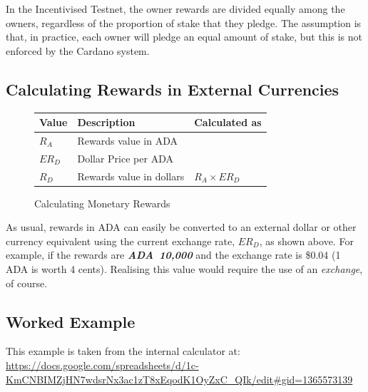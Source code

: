 \documentclass[11pt,a4paper,dvipsnames,twosided,final]{article}
\newcommand{\ada}{ADA{}}
\newcommand{\ADA}[1]{\textbf{\emph{\ada~{#1}}}}
\newcommand{\cardano}[1]{Cardano}
\begin{document}
\noindent
In the Incentivised Testnet, the owner rewards are divided equally among the
owners, regardless of the proportion of stake that they pledge.  The assumption
is that, in practice, each owner will pledge an equal amount of stake, but this
is not enforced by the \cardano{} system.

\clearpage
\subsection{Calculating Rewards in External Currencies}

\begin{figure}[h!]
\begin{center}
\begin{tabular}{||l|p{6cm}|l||}
  \hline \hline
\textbf{Value} & \textbf{Description} & \textbf{Calculated as} \\\hline
$R_A$ &  Rewards value in \ada{} &\\\hline
$ER_D$ &  Dollar Price per \ada{} &\\\hline
$R_D$ &  Rewards value in dollars & $R_A \times ER_D$ \\\hline
\hline
\end{tabular}
\end{center}
\caption{Calculating Monetary Rewards}
\label{fig:monetary}
\end{figure}

\noindent
As usual, rewards in \ada{} can easily be converted to an external dollar or other currency equivalent using
the current exchange rate, $ER_D$, as shown %
above.  For example, if the rewards are \ADA{10,000} and the exchange rate is
\$0.04 (1 \ada{} is worth 4 cents).  Realising this value would require the use of an \emph{exchange},
of course.

\clearpage
\subsection{Worked Example}


This example is taken from the \IOHK{} internal calculator at:
\url{https://docs.google.com/spreadsheets/d/1c-KmCNBIMZjHN7wdsrNx3ac1zT8xEqodK1OyZxC_QIk/edit#gid=1365573139}
\end{document}
